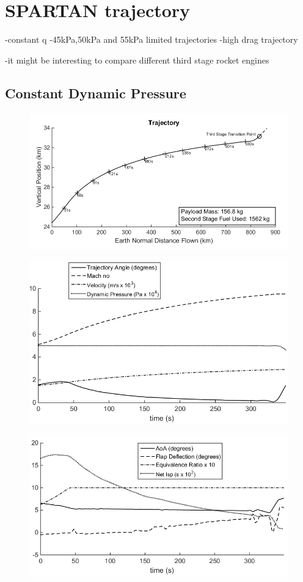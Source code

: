 \section{SPARTAN trajectory}
-constant q
-45kPa,50kPa and 55kPa limited trajectories
-high drag trajectory

-it might be interesting to compare different third stage rocket engines 

\subsection{Constant Dynamic Pressure}
\begin{figure}
\centering
\includegraphics[width=0.7\linewidth]{figures/5_Ascent/Constq}
\caption{}
\label{fig:Constq}
\end{figure}
\begin{figure}
\centering
\includegraphics[width=0.7\linewidth]{figures/5_Ascent/Constq-Aero}
\caption{}
\label{fig:Constq-Aero}
\end{figure}
\begin{figure}
\centering
\includegraphics[width=0.7\linewidth]{figures/5_Ascent/Constq-Vehicle}
\caption{}
\label{fig:Constq-Vehicle}
\end{figure}

